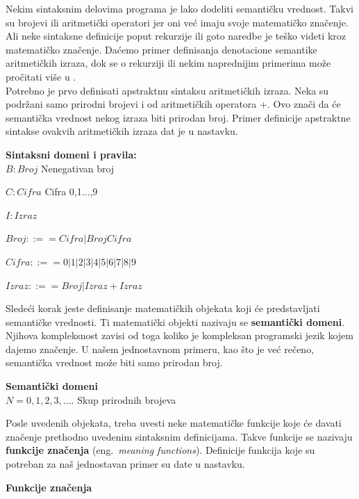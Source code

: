 \documentclass[a4paper]{article}
\begin{document}
{Nekim sintaksnim delovima programa je lako dodeliti semantičku vrednost. Takvi su brojevi ili aritmetički operatori jer oni već imaju svoje matematičko značenje. Ali neke sintaksne definicije poput rekurzije ili goto naredbe je teško videti kroz matematičko značenje. Daćemo primer definisanja denotacione semantike aritmetičkih izraza, dok se o rekurziji ili nekim naprednijim primerima može pročitati više u \cite{nielson}.\\


Potrebno je prvo definisati apstraktnu sintaksu aritmetičkih izraza. Neka su podržani samo prirodni brojevi i od aritmetičkih operatora +. Ovo znači da će semantička vrednost nekog izraza biti prirodan broj. Primer definicije apstraktne sintakse ovakvih aritmetičkih izraza dat je u nastavku.


\begin{tcolorbox}
\textbf{Sintaksni domeni i pravila:}
\\

$B: Broj $  \qquad\qquad Nenegativan broj

$C: Cifra $ \qquad\qquad Cifra 0,1...,9

$I: Izraz $

$ Broj ::== Cifra | Broj Cifra $

$ Cifra ::== 0 | 1 | 2 | 3 | 4 | 5 | 6 | 7 | 8 | 9 $

$ Izraz ::== Broj | Izraz+Izraz $
\end{tcolorbox}

Sledeći korak jeste definisanje matematičkih objekata koji će predstavljati semantičke vrednosti.  Ti matematički objekti nazivaju se \textbf{semantički domeni}. Njihova kompleksnost zavisi od toga koliko je kompleksan programski jezik kojem dajemo značenje. U našem jednostavnom primeru, kao što je već rečeno, semantička vrednost može biti samo prirodan broj.
\begin{tcolorbox}
\textbf{Semantički domeni}
\\

$N={0,1,2,3,....} $  \qquad\qquad Skup prirodnih brojeva

\end{tcolorbox}
Posle uvedenih objekata, treba uvesti neke matematičke funkcije koje će davati značenje prethodno uvedenim sintaksnim definicijama. Takve funkcije se nazivaju \textbf{funkcije značenja }(eng.~{\em meaning functions}). Definicije funkcija koje su potreban za naš jednostavan primer su date u nastavku.
\begin{tcolorbox}
\textbf{Funkcije značenja}
\\


\end{tcolorbox}}
\end{document}
